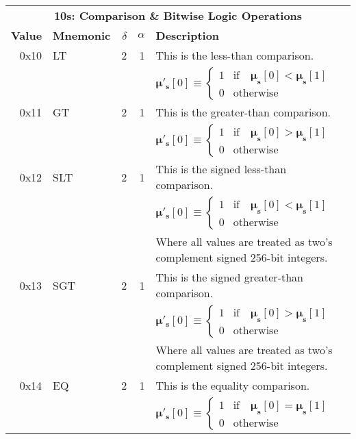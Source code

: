 \documentclass[9pt,oneside]{amsart}
\begin{document}
\begin{tabularx}{\textwidth}{rlrrX}
\toprule
\multicolumn{5}{c}{\textbf{10s: Comparison \& Bitwise Logic Operations}} \\
\textbf{Value} & \textbf{Mnemonic} & $\delta$ & $\alpha$ & \textbf{Description} \vspace{5pt} \\
0x10 & {\small LT} & 2 & 1 & This is the less-than comparison. \\
&&&& $\boldsymbol{\mu}'_\mathbf{s}[0] \equiv \begin{cases} 1 & \text{if} \quad \boldsymbol{\mu}_\mathbf{s}[0] < \boldsymbol{\mu}_\mathbf{s}[1] \\ 0 & \text{otherwise} \end{cases}$ \\
\midrule
0x11 & {\small GT} & 2 & 1 & This is the greater-than comparison. \\
&&&& $\boldsymbol{\mu}'_\mathbf{s}[0] \equiv \begin{cases} 1 & \text{if} \quad \boldsymbol{\mu}_\mathbf{s}[0] > \boldsymbol{\mu}_\mathbf{s}[1] \\ 0 & \text{otherwise} \end{cases}$ \\
\midrule
0x12 & {\small SLT} & 2 & 1 & This is the signed less-than comparison. \\
&&&& $\boldsymbol{\mu}'_\mathbf{s}[0] \equiv \begin{cases} 1 & \text{if} \quad \boldsymbol{\mu}_\mathbf{s}[0] < \boldsymbol{\mu}_\mathbf{s}[1] \\ 0 & \text{otherwise} \end{cases}$ \\
&&&& Where all values are treated as two's complement signed 256-bit integers. \\
\midrule
0x13 & {\small SGT} & 2 & 1 & This is the signed greater-than comparison. \\
&&&& $\boldsymbol{\mu}'_\mathbf{s}[0] \equiv \begin{cases} 1 & \text{if} \quad \boldsymbol{\mu}_\mathbf{s}[0] > \boldsymbol{\mu}_\mathbf{s}[1] \\ 0 & \text{otherwise} \end{cases}$ \\
&&&& Where all values are treated as two's complement signed 256-bit integers. \\
\midrule
0x14 & {\small EQ} & 2 & 1 & This is the equality comparison. \\
&&&& $\boldsymbol{\mu}'_\mathbf{s}[0] \equiv \begin{cases} 1 & \text{if} \quad \boldsymbol{\mu}_\mathbf{s}[0] = \boldsymbol{\mu}_\mathbf{s}[1] \\ 0 & \text{otherwise} \end{cases}$ \\

\end{tabularx}
\end{document}
